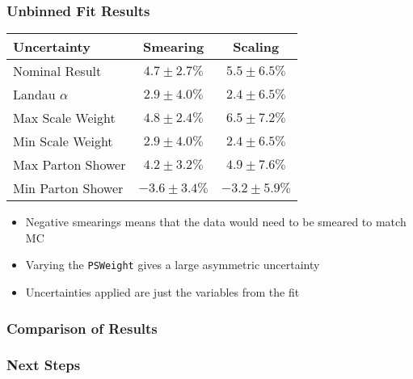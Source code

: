 \documentclass{beamer}
\newcommand{\beginbackup}{
  \newcounter{framenumbervorappendix}
  \setcounter{framenumbervorappendix}{\value{framenumber}}
}
\newcommand{\backupend}{
  \addtocounter{framenumbervorappendix}{-\value{framenumber}}
  \addtocounter{framenumber}{\value{framenumbervorappendix}}
}
\begin{document}
\begin{frame}
  \frametitle{Unbinned Fit Results}

  \centering

  \begin{tabular}{|l|c|c|}
    \hline
    Uncertainty & Smearing & Scaling \\
    \hline
    Nominal Result & $4.7 \pm 2.7 \%$ & $5.5 \pm 6.5 \%$ \\
    Landau $\alpha$ & $2.9 \pm 4.0 \%$ & $2.4 \pm 6.5 \%$ \\
    \hline
    Max Scale Weight & $4.8 \pm 2.4 \%$ & $6.5 \pm 7.2 \%$ \\
    Min Scale Weight & $2.9 \pm 4.0 \%$ & $2.4 \pm 6.5 \%$ \\
    \hline
    Max Parton Shower & $4.2 \pm 3.2 \%$ & $4.9 \pm 7.6 \%$ \\
    Min Parton Shower & $-3.6 \pm 3.4 \%$ & $-3.2 \pm 5.9 \%$ \\
    \hline
  \end{tabular}

  \begin{itemize}
  \item Negative smearings means that the data would need to be smeared to match MC
  \item Varying the \texttt{PSWeight} gives a large asymmetric uncertainty
  \item Uncertainties applied are just the variables from the fit
  \end{itemize}

\end{frame}


\begin{frame}
  \frametitle{Comparison of Results}

\end{frame}


\begin{frame}
  \frametitle{Next Steps}

\end{frame}


\begin{comment}
\beginbackup

\begin{frame}
  \centering
    {\Huge \bf\sffamily Backup Slides}
\end{frame}



\backupend
\end{comment}
\end{document}
